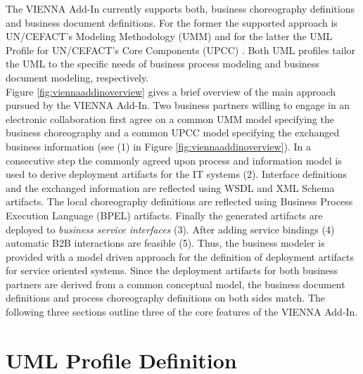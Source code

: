 \documentclass{acm_proc_article-sp}
\begin{document}
The VIENNA Add-In currently supports both, business choreography definitions and business document definitions. For the former the supported approach is UN/CEFACT's Modeling Methodology (UMM) \cite{man:umm2} and for the latter the UML Profile for UN/CEFACT's Core Components (UPCC) \cite{man:upcc}. Both UML profiles tailor the UML to the specific needs of business process modeling and business document modeling, respectively. \\Figure \ref{fig:viennaaddinoverview} gives a brief overview of the main approach pursued by the VIENNA Add-In. Two business partners willing to engage in an electronic collaboration first agree on a common UMM model specifying the business choreography and a common UPCC model specifying the exchanged business information (see (1) in Figure \ref{fig:viennaaddinoverview}). In a consecutive step the commonly agreed upon process and information model is used to derive deployment artifacts for the IT systems (2). Interface definitions and the exchanged information are reflected using WSDL and XML Schema artifacts. The local choreography definitions are reflected using Business Process Execution Language (BPEL) artifacts. Finally the generated artifacts are deployed to \textit{business service interfaces} (3). After adding service bindings (4) automatic B2B interactions are feasible (5). Thus, the business modeler is provided with a model driven approach for the definition of deployment artifacts for service oriented systems. Since the deployment artifacts for both business partners are derived from a common conceptual model, the business document definitions and process choreography definitions on both sides match. The following three sections outline three of the core features of the VIENNA Add-In.


\section{UML Profile Definition}
 
\end{document}
